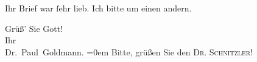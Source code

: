 \pstart
           Ihr Brief war{ }ſehr lieb. Ich bitte um einen andern.\pend
           
\pstart
           Grüß’ Sie Gott! {\\[\baselineskip]}Ihr {\\[\baselineskip]}\spacefill\mbox{Dr. Paul Goldmann.}\pend
           \leftskip=0em{}
\pstart
           \noindent{}Bitte, grüßen Sie den \textsc{Dr. Schnitzler}!\pend
           \endnumbering{}  \newcommand{\dateiname}{L03538}\newcommand{\titel}{Paul Goldmann an Olga und Elisabeth Gussmann, 28. 12. [1900?]}\newcommand{\editorInnen}{Martin Anton Müller und Laura Untner}
